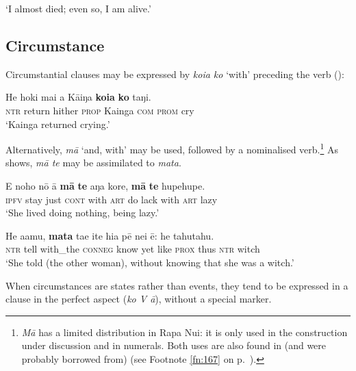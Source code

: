 \glt 
‘I almost died; even so, I am alive.’ \textstyleExampleref{[R437.050]}\textstyleExampleref{} 
\z
{}

\subsection{Circumstance}\label{sec:11.6.8}
Circumstantial clauses may be expressed by \textit{koia ko} ‘with’ preceding the verb ():


\ea\label{ex:11.271}
\gll He hoki mai a Kāiŋa \textbf{koia} \textbf{ko} taŋi.\\
\textsc{ntr} return hither \textsc{prop} Kainga \textsc{com} \textsc{prom} cry\\

\glt
‘Kainga returned crying.’ \textstyleExampleref{[R243.173]} 
\z

Alternatively, \textit{mā} ‘and, with’ may be used, followed by a nominalised verb.\footnote{\label{fn:538}\textit{Mā} has a limited distribution in Rapa Nui: it is only used in the construction under discussion and in numerals. Both uses are also found in (and were probably borrowed from)  (see Footnote \ref{fn:167} on p.~\pageref{fn:167}).} As  shows, \textit{mā te} may be assimilated to \textit{mata}.

\ea\label{ex:11.272}
\gll E noho nō {\ꞌ}ā \textbf{mā} \textbf{te} aŋa kore, \textbf{mā} \textbf{te} hupehupe. \\
\textsc{ipfv} stay just \textsc{cont} with \textsc{art} do lack with \textsc{art} lazy \\

\glt 
‘She lived doing nothing, being lazy.’ \textstyleExampleref{[R368.016]} 
\z

\ea\label{ex:11.273}
\gll He {\ꞌ}a{\ꞌ}amu, \textbf{mata} ta{\ꞌ}e {\ꞌ}ite hia pē nei ē: he tahutahu. \\
\textsc{ntr} tell with\_the \textsc{conneg} know yet like \textsc{prox} thus \textsc{ntr} witch \\

\glt 
‘She told (the other woman), without knowing that she was a witch.’ \textstyleExampleref{[R532-07.044]}
\z

When circumstances are states rather than events, they tend to be expressed in a clause in the perfect aspect (\textit{ko V {\ꞌ}ā}), without a special marker. 

